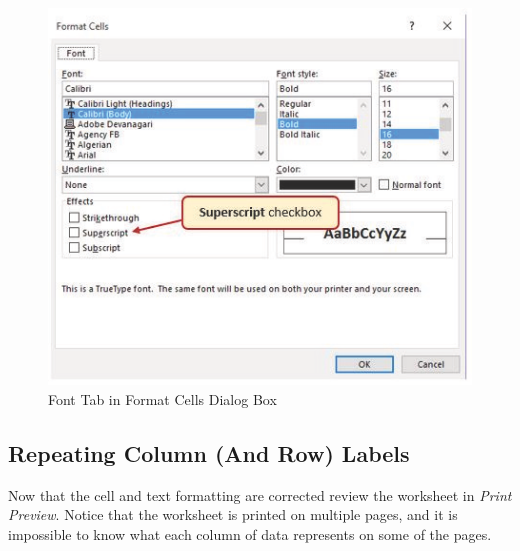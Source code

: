 \begin{figure}[H]
	\centering
	\includegraphics[width=\maxwidth{.95\linewidth}]{gfx/ch03_fig28}
	\caption{Font Tab in Format Cells Dialog Box}
	\label{03:fig28}
\end{figure}

\subsection{Repeating Column (And Row) Labels}

Now that the cell and text formatting are corrected review the worksheet in \textit{Print Preview}. Notice that the worksheet is printed on multiple pages, and it is impossible to know what each column of data represents on some of the pages.


